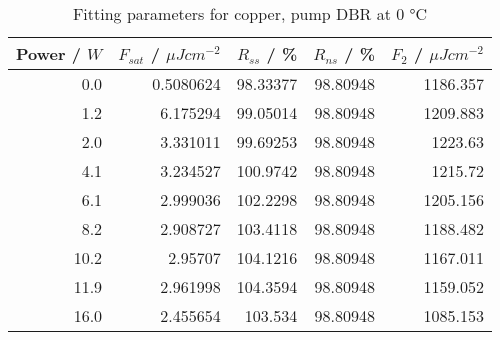 \begin{table}[H]
\caption{Fitting parameters for copper, pump DBR at $0$ °C}
\begin{tabular}{rrrrr}
\toprule
Power / $W$ & $F_{sat}$ / $\mu Jcm^{-2}$ & $R_{ss}$ / \% & $R_{ns}$ / \% & $F_2$ / $\mu Jcm^{-2}$ \\
\midrule
0.0 & 0.5080624 & 98.33377 & 98.80948 & 1186.357 \\
1.2 & 6.175294 & 99.05014 & 98.80948 & 1209.883 \\
2.0 & 3.331011 & 99.69253 & 98.80948 & 1223.63 \\
4.1 & 3.234527 & 100.9742 & 98.80948 & 1215.72 \\
6.1 & 2.999036 & 102.2298 & 98.80948 & 1205.156 \\
8.2 & 2.908727 & 103.4118 & 98.80948 & 1188.482 \\
10.2 & 2.95707 & 104.1216 & 98.80948 & 1167.011 \\
11.9 & 2.961998 & 104.3594 & 98.80948 & 1159.052 \\
16.0 & 2.455654 & 103.534 & 98.80948 & 1085.153 \\
\bottomrule
\end{tabular}
\end{table}
